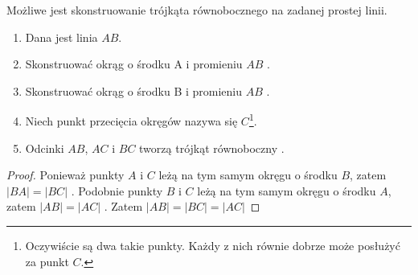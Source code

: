 \documentclass[12pt, a4paper]{scrartcl}
\begin{document}
\begin{theorem}

Możliwe jest skonstruowanie trójkąta równobocznego na zadanej prostej linii.

\begin{figure}[h!]
    \begin{center}
    \end{center}
\end{figure}

\begin{enumerate}
    \item Dana jest linia \(AB\).
    \item Skonstruować okrąg o środku A i promieniu \(AB\) .
    \item Skonstruować okrąg o środku B i promieniu \(AB\) .
    \item Niech punkt przecięcia okręgów nazywa się \(C\)\footnote{
        Oczywiście są dwa takie punkty. Każdy z nich równie dobrze może posłużyć
        za punkt \(C\).
    }.
    \item Odcinki \(AB\), \(AC\) i \(BC\) tworzą trójkąt równoboczny .
\end{enumerate}

\begin{proof}
    Ponieważ punkty \(A\) i \(C\) leżą na tym samym okręgu o środku \(B\), zatem
    \(|BA| = |BC|\) .
    Podobnie punkty \(B\) i \(C\) leżą na tym samym okręgu o środku \(A\), zatem
    \(|AB| = |AC|\) .
    Zatem \(|AB| = |BC| = |AC|\) 
\end{proof}
\end{theorem}
\end{document}
